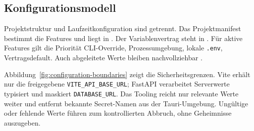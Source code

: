\subsection{Konfigurationsmodell}
\label{subsec:konfigurationsmodell}

Projektstruktur und Laufzeitkonfiguration sind getrennt. Das Projektmanifest
bestimmt die Features und liegt in . Der
Variablenvertrag steht in . Für aktive Features gilt die
Priorität CLI-Override, Prozessumgebung, lokale \texttt{.env}, Vertragsdefault.
Auch abgeleitete Werte bleiben nachvollziehbar
\parencite{kleiveist2026configuration}.

Abbildung~\ref{fig:configuration-boundaries} zeigt die Sicherheitsgrenzen.
Vite erhält nur die freigegebene \texttt{VITE\_API\_BASE\_URL}; FastAPI
verarbeitet Serverwerte typisiert und maskiert \texttt{DATABASE\_URL}. Das
Tooling reicht nur relevante Werte weiter und entfernt bekannte Secret-Namen
aus der Tauri-Umgebung. Ungültige oder fehlende Werte führen zum kontrollierten
Abbruch, ohne Geheimnisse auszugeben.


